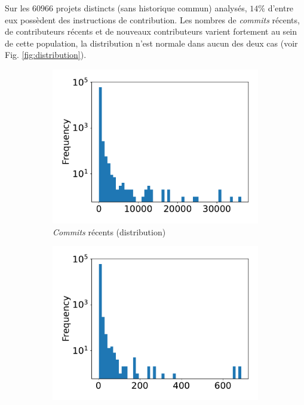 \documentclass[dvipsnames,runningheads]{llncs}
\newcommand{\en}[1]{\foreignlanguage{english}{\emph{#1}}}
\begin{document}
    Sur les $60 966$ projets distincts (sans historique commun) analysés, $14\%$ d'entre eux possèdent des
    instructions de contribution. Les nombres de \en{commits} récents, de contributeurs récents et de nouveaux
    contributeurs varient fortement au sein de cette population, la distribution n'est normale dans aucun des
    deux cas (voir Fig. \ref{fig:distribution}).

    \begin{figure}[ht]
        \begin{subfigure}[t]{0.333\textwidth}
            \includegraphics[width=\textwidth]{../experiment/data_analysis/recentCommitCount_distribution}
            \caption{\en{Commits} récents (distribution)}
        \end{subfigure}
        \begin{subfigure}[t]{0.333\textwidth}
            \includegraphics[width=\textwidth]{../experiment/data_analysis/recentContributorCount_distribution}

\end{subfigure}
\end{figure}
\end{document}
